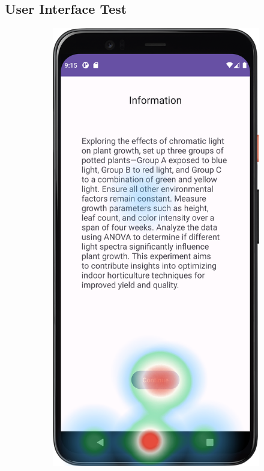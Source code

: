 \subsection*{User Interface Test}\label{appendix:heatmapTimes}

\begin{figure}[htbp]
    \centering
    \begin{subfigure}[b]{0.25\textwidth}
        \centering
        \includegraphics[width=\textwidth]{content/07_evaluation_of_the_solution/HeatMap_InfoScreen.png}

\end{subfigure}
\end{figure}
